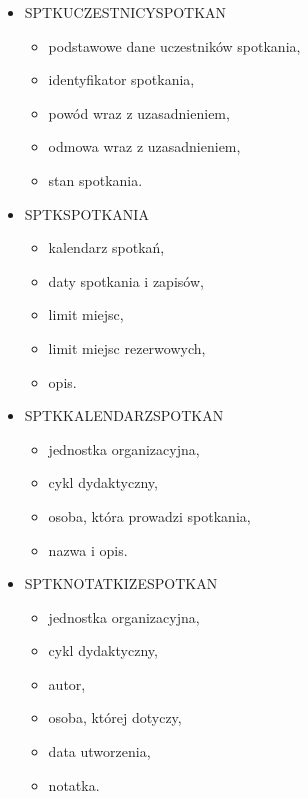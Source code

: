 \documentclass[licencjacka]{pracamgr}
\begin{document}
\begin{itemize}
\item SPTK\textunderscore UCZESTNICY\textunderscore SPOTKAN
	\begin{itemize}
	\item podstawowe dane uczestników spotkania,
	\item identyfikator spotkania,
	\item powód wraz z uzasadnieniem,
	\item odmowa wraz z uzasadnieniem,
	\item stan spotkania.
	\end{itemize}
\item SPTK\textunderscore SPOTKANIA
	\begin{itemize}
	\item kalendarz spotkań,
	\item daty spotkania i zapisów,
	\item limit miejsc,
	\item limit miejsc rezerwowych,
	\item opis.
	\end{itemize}
\newpage
\item SPTK\textunderscore KALENDARZ\textunderscore SPOTKAN
	\begin{itemize}
	\item jednostka organizacyjna,
	\item cykl dydaktyczny,
	\item osoba, która prowadzi spotkania,
	\item nazwa i opis.
	\end{itemize}
\item SPTK\textunderscore NOTATKI\textunderscore ZE\textunderscore SPOTKAN
	\begin{itemize}
	\item jednostka organizacyjna,
	\item cykl dydaktyczny,
	\item autor,
	\item osoba, której dotyczy,
	\item data utworzenia,
	\item notatka.
	\end{itemize}
\end{itemize}
\end{document}
